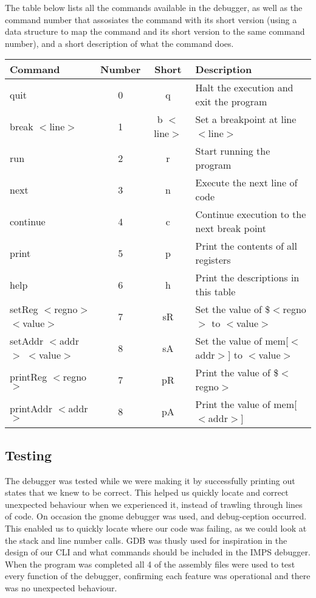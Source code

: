 \documentclass[11pt]{report}
\begin{document}
The table below lists all the commands available in the debugger, as well as the 
command number that assosiates the command with its short version (using a data 
structure to map the command and its short version to the same command number), 
and a short description of what the command does.
\\
\begin{adjustwidth}{-.5in}{-.5in} 
	\begin{center} 
	\begin{tabular}{ | l | c | c | p{5cm} |}
	\hline
	Command & Number & Short & Description \\ \hline
	quit & 0 & q & Halt the execution and exit the program \\ \hline
	break $<$line$>$ & 1 & b $<$line$>$ & Set a breakpoint at line $<$line$>$ \\ \hline
	run & 2 & r & Start running the program \\ \hline
	next & 3 & n & Execute the next line of code \\ \hline
	continue & 4 & c & Continue execution to the next break point \\ \hline
	print & 5 & p & Print the contents of all registers \\ \hline
	help & 6 & h & Print the descriptions in this table \\ \hline
	setReg $<$regno$>$ $<$value$>$ & 7 & sR & Set the value of \$$<$regno$>$ to $<$value$>$ \\ \hline
	setAddr $<$addr$>$ $<$value$>$ & 8 & sA & Set the value of mem[$<$addr$>$] to $<$value$>$ \\ \hline
	printReg $<$regno$>$ & 7 & pR & Print the value of \$$<$regno$>$ \\ \hline
	printAddr $<$addr$>$ & 8 & pA & Print the value of mem[$<$addr$>$] \\ \hline
	\end{tabular}
	\end{center}
\end{adjustwidth}

\subsection*{Testing}

The debugger was tested while we were making it by successfully printing out states that we knew to be correct. 
This helped us quickly locate and correct unexpected behaviour when we experienced it, instead of trawling through 
lines of code. On occasion the gnome debugger was used, and debug-ception occurred. This enabled us to quickly 
locate where our code was failing, as we could look at the stack and line number calls. GDB was thusly used
for inspiration in the design of our CLI and what commands should be included in the IMPS debugger. When 
the program was completed all 4 of the assembly files were used to test every function of the debugger, confirming
each feature was operational and there was no unexpected behaviour.
\end{document}
